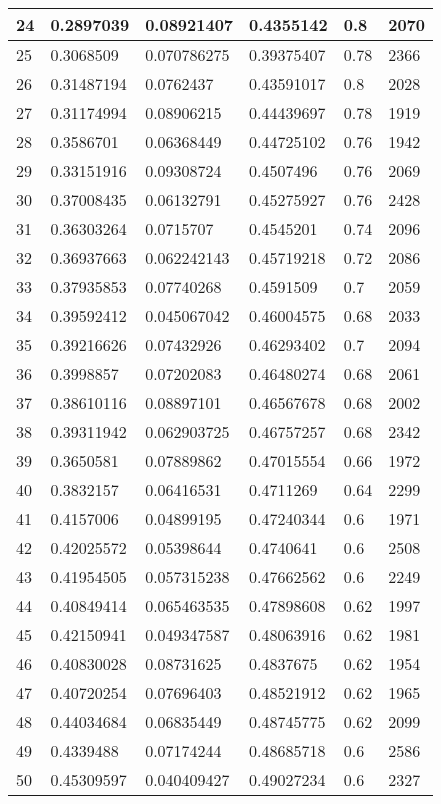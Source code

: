 \begin{longtable}{|l|l|l|l|l|l|}
24 & 0.2897039 & 0.08921407 & 0.4355142 & 0.8 & 2070 \\ \hline 
25 & 0.3068509 & 0.070786275 & 0.39375407 & 0.78 & 2366 \\ \hline 
26 & 0.31487194 & 0.0762437 & 0.43591017 & 0.8 & 2028 \\ \hline 
27 & 0.31174994 & 0.08906215 & 0.44439697 & 0.78 & 1919 \\ \hline 
28 & 0.3586701 & 0.06368449 & 0.44725102 & 0.76 & 1942 \\ \hline 
29 & 0.33151916 & 0.09308724 & 0.4507496 & 0.76 & 2069 \\ \hline 
30 & 0.37008435 & 0.06132791 & 0.45275927 & 0.76 & 2428 \\ \hline 
31 & 0.36303264 & 0.0715707 & 0.4545201 & 0.74 & 2096 \\ \hline 
32 & 0.36937663 & 0.062242143 & 0.45719218 & 0.72 & 2086 \\ \hline 
33 & 0.37935853 & 0.07740268 & 0.4591509 & 0.7 & 2059 \\ \hline 
34 & 0.39592412 & 0.045067042 & 0.46004575 & 0.68 & 2033 \\ \hline 
35 & 0.39216626 & 0.07432926 & 0.46293402 & 0.7 & 2094 \\ \hline 
36 & 0.3998857 & 0.07202083 & 0.46480274 & 0.68 & 2061 \\ \hline 
37 & 0.38610116 & 0.08897101 & 0.46567678 & 0.68 & 2002 \\ \hline 
38 & 0.39311942 & 0.062903725 & 0.46757257 & 0.68 & 2342 \\ \hline 
39 & 0.3650581 & 0.07889862 & 0.47015554 & 0.66 & 1972 \\ \hline 
40 & 0.3832157 & 0.06416531 & 0.4711269 & 0.64 & 2299 \\ \hline 
41 & 0.4157006 & 0.04899195 & 0.47240344 & 0.6 & 1971 \\ \hline 
42 & 0.42025572 & 0.05398644 & 0.4740641 & 0.6 & 2508 \\ \hline 
43 & 0.41954505 & 0.057315238 & 0.47662562 & 0.6 & 2249 \\ \hline 
44 & 0.40849414 & 0.065463535 & 0.47898608 & 0.62 & 1997 \\ \hline 
45 & 0.42150941 & 0.049347587 & 0.48063916 & 0.62 & 1981 \\ \hline 
46 & 0.40830028 & 0.08731625 & 0.4837675 & 0.62 & 1954 \\ \hline 
47 & 0.40720254 & 0.07696403 & 0.48521912 & 0.62 & 1965 \\ \hline 
48 & 0.44034684 & 0.06835449 & 0.48745775 & 0.62 & 2099 \\ \hline 
49 & 0.4339488 & 0.07174244 & 0.48685718 & 0.6 & 2586 \\ \hline 
50 & 0.45309597 & 0.040409427 & 0.49027234 & 0.6 & 2327 \\ \hline 
\end{longtable}